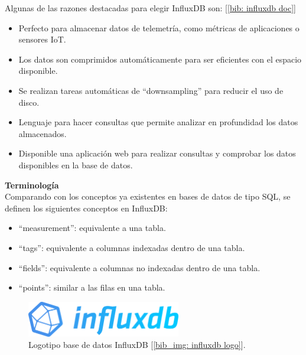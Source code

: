 \documentclass[a4paper, oneside, 12pt]{book}
\begin{document}
	\noindent Algunas de las razones destacadas para elegir InfluxDB son: [\ref{bib: influxdb doc}]
	
	\begin{itemize}
		\item Perfecto para almacenar datos de telemetría, como métricas de aplicaciones o sensores IoT.
		\item Los datos son comprimidos automáticamente para ser eficientes con el espacio disponible.
		\item Se realizan tareas automáticas de ``downsampling'' para reducir el uso de disco.
		\item Lenguaje para hacer consultas que permite analizar en profundidad los datos almacenados.
		\item Disponible una aplicación web para realizar consultas y comprobar los datos disponibles en la base de datos.
	\end{itemize}

	\vspace{10px}

	\noindent \textbf{\large Terminología} \\
	
	\noindent Comparando con los conceptos ya existentes en bases de datos de tipo SQL, se definen los siguientes conceptos en InfluxDB:
	
	\begin{itemize}
		\item ``measurement'': equivalente a una tabla.
		\item ``tags'': equivalente a columnas indexadas dentro de una tabla.
		\item ``fields'': equivalente a columnas no indexadas dentro de una tabla.
		\item ``points'': similar a las filas en una tabla.
	\end{itemize}

	\vspace{20px}

	\begin{figure}[h!]
		\begin{center}
			\includegraphics[width=0.6\textwidth]{img/InfluxDB.png}
			\caption{Logotipo base de datos InfluxDB [\ref{bib_img: influxdb logo}].}
			\label{img: influxdb logo}
		\end{center}
	\end{figure}
	
\end{document}
